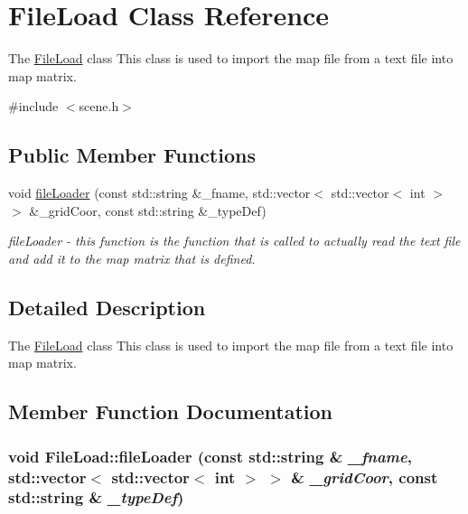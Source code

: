 \hypertarget{classFileLoad}{
\section{FileLoad Class Reference}
\label{classFileLoad}
}


The \hyperlink{classFileLoad}{FileLoad} class This class is used to import the map file from a text file into map matrix.  


{\ttfamily \#include $<$scene.h$>$}\subsection*{Public Member Functions}
\begin{DoxyCompactItemize}
\item 
void \hyperlink{classFileLoad_a808bf406f3910a85ee24de919fa80a51}{fileLoader} (const std::string \&\_\-fname, std::vector$<$ std::vector$<$ int $>$ $>$ \&\_\-gridCoor, const std::string \&\_\-typeDef)
\begin{DoxyCompactList}\small\item\em fileLoader -\/ this function is the function that is called to actually read the text file and add it to the map matrix that is defined. \item\end{DoxyCompactList}\end{DoxyCompactItemize}


\subsection{Detailed Description}
The \hyperlink{classFileLoad}{FileLoad} class This class is used to import the map file from a text file into map matrix. 

\subsection{Member Function Documentation}
\hypertarget{classFileLoad_a808bf406f3910a85ee24de919fa80a51}{
\subsubsection[{fileLoader}]{\setlength{\rightskip}{0pt plus 5cm}void FileLoad::fileLoader (const std::string \& {\em \_\-fname}, \/  std::vector$<$ std::vector$<$ int $>$ $>$ \& {\em \_\-gridCoor}, \/  const std::string \& {\em \_\-typeDef})}}
\label{classFileLoad_a808bf406f3910a85ee24de919fa80a51}


